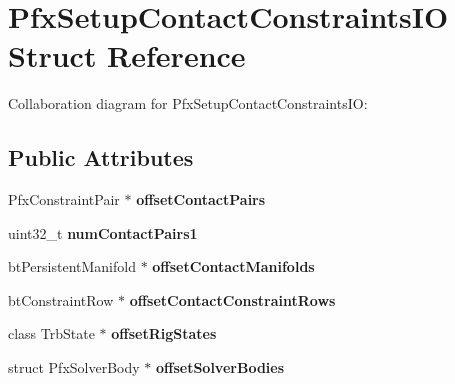 \hypertarget{struct_pfx_setup_contact_constraints_i_o}{\section{Pfx\+Setup\+Contact\+Constraints\+I\+O Struct Reference}
\label{struct_pfx_setup_contact_constraints_i_o}
}


Collaboration diagram for Pfx\+Setup\+Contact\+Constraints\+I\+O\+:
\subsection*{Public Attributes}
\begin{DoxyCompactItemize}
\item 
\hypertarget{struct_pfx_setup_contact_constraints_i_o_a8d7d496c4dcb46d516c77ad5ed151dac}{Pfx\+Constraint\+Pair $\ast$ {\bfseries offset\+Contact\+Pairs}}\label{struct_pfx_setup_contact_constraints_i_o_a8d7d496c4dcb46d516c77ad5ed151dac}

\item 
\hypertarget{struct_pfx_setup_contact_constraints_i_o_a31699dd85f1161f33865bdff10c2f980}{uint32\+\_\+t {\bfseries num\+Contact\+Pairs1}}\label{struct_pfx_setup_contact_constraints_i_o_a31699dd85f1161f33865bdff10c2f980}

\item 
\hypertarget{struct_pfx_setup_contact_constraints_i_o_a7547495a2345db8b4d704443c2cea3ae}{bt\+Persistent\+Manifold $\ast$ {\bfseries offset\+Contact\+Manifolds}}\label{struct_pfx_setup_contact_constraints_i_o_a7547495a2345db8b4d704443c2cea3ae}

\item 
\hypertarget{struct_pfx_setup_contact_constraints_i_o_a8ad36f357ea2ca983af6de838f8d4555}{bt\+Constraint\+Row $\ast$ {\bfseries offset\+Contact\+Constraint\+Rows}}\label{struct_pfx_setup_contact_constraints_i_o_a8ad36f357ea2ca983af6de838f8d4555}

\item 
\hypertarget{struct_pfx_setup_contact_constraints_i_o_acc1052e99a354205458ba67b8ea23043}{class Trb\+State $\ast$ {\bfseries offset\+Rig\+States}}\label{struct_pfx_setup_contact_constraints_i_o_acc1052e99a354205458ba67b8ea23043}

\item 
\hypertarget{struct_pfx_setup_contact_constraints_i_o_a2beba8a4ab6a0d77b68ef6a72b9a9b35}{struct Pfx\+Solver\+Body $\ast$ {\bfseries offset\+Solver\+Bodies}}\label{struct_pfx_setup_contact_constraints_i_o_a2beba8a4ab6a0d77b68ef6a72b9a9b35}


\end{DoxyCompactItemize}
